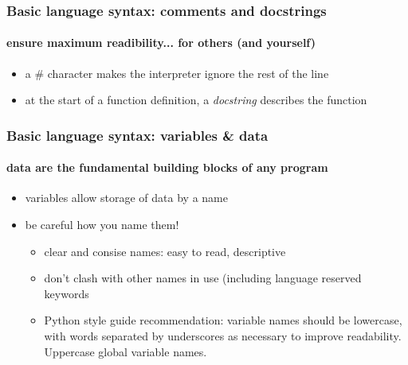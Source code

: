 \documentclass{beamer}
\begin{document}

    \begin{frame}
	    \frametitle{Basic language syntax: comments and docstrings}
	    \framesubtitle{ensure maximum readibility... for others (and yourself)}
	    \begin{itemize}
		    \item a \# character makes the interpreter ignore the rest of the line
		    \item at the start of a function definition, a \textit{docstring} describes the function
	    \end{itemize}
	    \lstC
    \end{frame}








    \begin{frame}
	    \frametitle{Basic language syntax: variables \& data}
	    \framesubtitle{data are the fundamental building blocks of any program}
	    \begin{itemize}
		    \item variables allow storage of data by a name
		    \item be careful how you name them!
			    \begin{itemize}
				    \item clear and consise names: easy to read, descriptive
				    \item don't clash with other names in use (including language reserved keywords
				    \item Python style guide recommendation: variable names should be lowercase, with words separated by underscores as necessary to improve readability.
					    Uppercase global variable names.
			    \end{itemize}
	    \end{itemize}
	    \lstD
    \end{frame}
\end{document}
